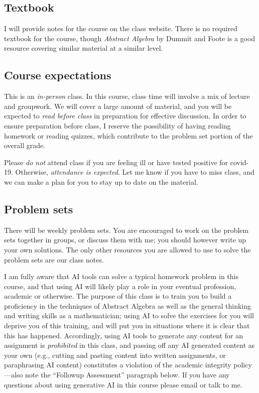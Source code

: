 \documentclass[12pt]{amsart}
\begin{document}
	\subsection*{Textbook} 
	
	I will provide notes for the course on the class website. There is no required textbook for the course, though \textit{Abstract Algebra} by Dummit and Foote is a good resource covering similar material at a similar level. 

	
\subsection*{Course expectations} 
This is an {\it in-person} class.  In this course, class time will involve a mix of lecture and groupwork. We will cover a large amount of material, and you will be expected to {\it read before class} in preparation for effective discussion. In order to ensure preparation before class, I reserve the possibility of having reading homework or reading quizzes, which contribute to the problem set portion of the overall grade.

Please {\it do not} attend class if you are feeling ill or have tested positive for covid-19. Otherwise, {\it attendance is expected}. Let me know if you have to miss class, and we can make a plan for you to stay up to date on the material.



\subsection*{Problem sets}
There will be weekly problem sets. You are encouraged to work on the problem sets together in groups, or discuss them with me; you should however write up your own solutions. The only other resources you are allowed to use to solve the problem sets are our class notes.

I am fully aware that AI tools can solve a typical homework problem in this course, and that using AI will likely play a role in your eventual profession, academic or otherwise. The purpose of this class is to train you to build a proficiency in the techniques of Abstract Algebra as well as the general thinking and writing skills as a mathematician; using AI to solve the exercises for you will deprive you of this training, and will put you in situations where it is clear that this has happened. Accordingly, using AI tools to generate any content for an assignment is {\it prohibited} in this class, and passing off any AI generated content as your own (e.g., cutting and pasting content into written assignments, or paraphrasing AI content) constitutes a violation of the academic integrity policy---also note the ``Followup Assessment'' paragraph below. If you have any questions about using generative AI in this course please email or talk to me.
\end{document}
